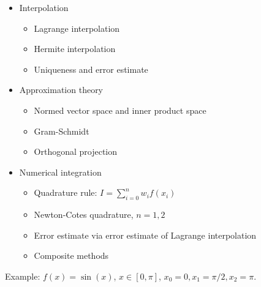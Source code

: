 \documentclass[20pt]{article} %
\theoremstyle{break}
\begin{document}
   \begin{itemize}
   \item Interpolation
     \begin{itemize}
      \item Lagrange interpolation
      \item Hermite interpolation
      \item Uniqueness and error estimate
      \end{itemize}
    \item Approximation theory
      \begin{itemize}
        \item Normed vector space and inner product space
        \item Gram-Schmidt
        \item Orthogonal projection
        \end{itemize}
      \item Numerical integration
        \begin{itemize}
        \item Quadrature rule: $I=\sum_{i=0}^nw_if(x_i)$
        \item Newton-Cotes quadrature, $n=1, 2$
        \item Error estimate via error estimate of Lagrange interpolation
        \item Composite methods
        \end{itemize}
      \end{itemize}
      \newpage
      Example: $f(x)=\sin(x)$, $x\in [0, \pi]$, $x_0=0, x_1=\pi/2, x_2=\pi$.
\end{document}
